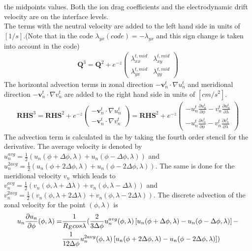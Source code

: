 the midpoints values. Both the ion drag coefficients and the
electrodynamic drift velocity
are on the interface levels. \\
%
The terms with the neutral velocity are added to the left hand side
in units of $[1/s]$.(Note that in the code $\lambda_{yx}(code) =-\lambda_{yx} $
and this sign change is taken into account in the code)
%
\begin{gather}
  \mathbf{Q}^3= \mathbf{Q}^2 + e^{-z}
   \begin{pmatrix}
       \lambda_{xx}^{t, mid} &  \lambda_{xy}^{t, mid}\\
       \lambda_{yx}^{t, mid} & \lambda_{yy}^{t, mid}
   \end{pmatrix}
\end{gather}
%
The horizontal advection terms in zonal direction $-
\mathbf{v}_n^t\cdot \nabla u_n^t$ and meridional direction $-
\mathbf{v}_n^t\cdot \nabla v_n^t$ are added to the right hand side
in units of $[cm/s^2]$.
%
\begin{gather}
  \mathbf{RHS}^3= \mathbf{RHS}^2 + e^{-z}
   \begin{pmatrix}
     -\mathbf{v}_n^t\cdot \nabla u_n^t  \\
     -\mathbf{v}_n^t\cdot \nabla v_n^t
   \end{pmatrix} = \mathbf{RHS}^2 + e^{-z}
   \begin{pmatrix}
     - u_n^t \frac{\partial u_n^t}{\partial \phi} - v_n^t \frac{\partial u_n^t}{\partial \lambda } \\
     - u_n^t \frac{\partial v_n^t}{\partial \phi} - v_n^t \frac{\partial v_n^t}{\partial \lambda }
   \end{pmatrix}
\end{gather} \label{eq:duv_horiz_advec}
%
The advection term is calculated in the  by
taking the fourth order stencil for the derivative. The average
velocity is denoted by $u_n^{avg} = \frac{1}{2} (u_n(\phi+\Delta
\phi,\lambda) + u_n (\phi-\Delta \phi,\lambda))$ and $u_n^{2 avg} =
\frac{1}{2} (u_n(\phi+2\Delta \phi,\lambda) + u_n (\phi-2\Delta
\phi,\lambda))$. The same is done for the meridional velocity $v_n$
which leads to $v_n^{avg} = \frac{1}{2} (v_n(\phi,\lambda+\Delta
\lambda) + v_n (\phi,\lambda-\Delta \lambda))$ and $v_n^{2 avg} =
\frac{1}{2} (v_n(\phi,\lambda+2\Delta \lambda) + v_n
(\phi,\lambda-2\Delta \lambda))$. The discrete advection of the
zonal velocity for the point $(\phi,\lambda)$ is
%
\begin{align}
  u_n \frac{\partial u_n}{\partial \phi}(\phi,\lambda) = &
  \frac{1}{R_E cos \lambda} ( \frac{2}{3 \Delta \phi}
  u_n^{avg}(\phi,\lambda) \left[
   u_n(\phi+\Delta
   \phi,\lambda) - u_n(\phi-\Delta
   \phi,\lambda)  \right] - \notag \\
   {} & \frac{1}
   {12 \Delta \phi}u_n^{2avg}(\phi,\lambda) \left[
   u_n(\phi+2\Delta
   \phi,\lambda) - u_n(\phi-2\Delta \phi,\lambda)  \right] )
\end{align}
